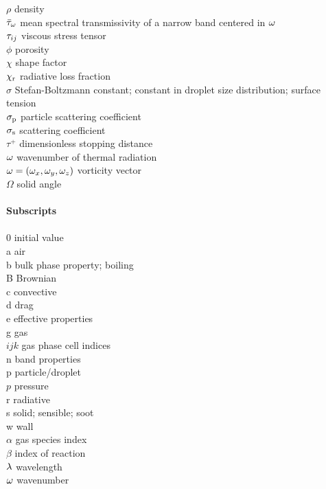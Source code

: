 \begin{tabbing}
$\rho$                    \> density \\
$\bar{\tau}_{\omega}$        \> mean spectral transmissivity of a narrow band centered in $\omega$ \\
$\mathbf{\tau}_{ij}$              \> viscous stress tensor \\
$\phi$                    \> porosity \\
$\chi$                    \> shape factor \\
$\chi_{\rm r}$            \> radiative loss fraction \\
$\sigma$                  \> Stefan-Boltzmann constant; constant in droplet size distribution; surface tension \\
$\sigma_{\rm p}$          \> particle scattering coefficient \\
$\sigma_{\rm s}$          \> scattering coefficient \\
$\tau^+$                  \> dimensionless stopping distance \\
$\omega$                     \> wavenumber of thermal radiation \\
${\mathbf{\omega}}=(\omega_x,\omega_y,\omega_z)$    \> vorticity vector \\
$\Omega$                  \> solid angle \\
\hspace{0.1in}            \> \\
{\bf Subscripts}          \> \\
\hspace{0.1in}            \> \\
0                         \> initial value \\
a                         \> air \\
b                         \> bulk phase property; boiling \\
B                         \> Brownian \\
c                         \> convective \\
d                         \> drag \\
e                         \> effective properties \\
g                         \> gas \\
$ijk$                     \> gas phase cell indices \\
n                         \> band properties \\
p                         \> particle/droplet \\
$p$                       \> pressure \\
r                         \> radiative \\
s                         \> solid; sensible; soot \\
w                         \> wall \\
$\alpha$                  \> gas species index \\
$\beta$                   \> index of reaction \\
$\lambda$                     \> wavelength \\
$\omega$                     \> wavenumber \\
\end{tabbing}

